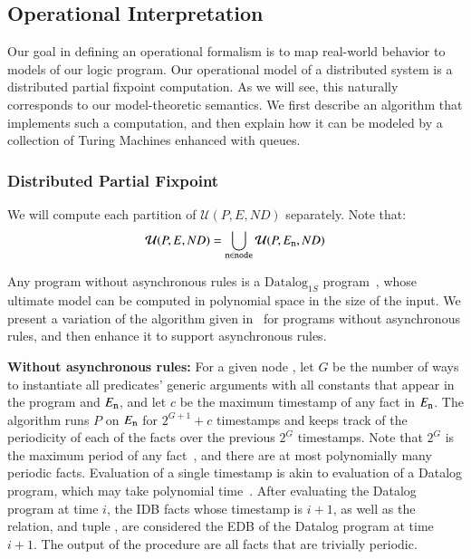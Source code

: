 \subsection{Operational Interpretation}
Our goal in defining an operational formalism is to map real-world behavior to models of our logic program.  Our operational model of a distributed system is a distributed partial fixpoint computation.  As we will see, this naturally corresponds to our model-theoretic semantics.  We first describe an algorithm that implements such a computation, and then explain how it can be modeled by a collection of Turing Machines enhanced with queues.

\subsubsection{Distributed Partial Fixpoint}

We will compute each partition of $\mathcal{U}(P, E, ND)$ separately.  Note that:
$$\mathcal{U}(P, E, ND) = \bigcup_{\text{\dedalus{{\scriptsize n}}} \in \text{\dedalus{{\scriptsize node}}}} \mathcal{U}(P, E_{\text{\dedalus{{\scriptsize n}}}}, ND)$$

Any \lang program without asynchronous rules is a $\text{Datalog}_{1S}$ program~\cite{tdd}, whose ultimate model can be computed in polynomial space in the size of the input.  We present a variation of the algorithm given in~\cite{tdd} for programs without asynchronous rules, and then enhance it to support asynchronous rules.

\vspace{1em}
{\bf Without asynchronous rules:}
For a given node , let $G$ be the number of ways to instantiate all predicates' generic arguments with all constants that appear in the program and $E_{\text{\dedalus{{\scriptsize n}}}}$, and let $c$ be the maximum timestamp of any fact in $E_{\text{\dedalus{{\scriptsize n}}}}$.  The algorithm runs $P$ on $E_{\text{\dedalus{{\scriptsize n}}}}$ for $2^{G+1} + c$ timestamps and keeps track of the periodicity of each of the facts over the previous $2^G$ timestamps.  Note that $2^G$ is the maximum period of any fact~\cite{tdd}, and there are at most polynomially many periodic facts.  Evaluation of a single timestamp is akin to evaluation of a Datalog program, which may take polynomial time~\cite{immerman-ptime, vardi-ptime}.  After evaluating the Datalog program at time $i$, the IDB facts whose timestamp is $i+1$, as well as the  relation, and tuple , are considered the EDB of the Datalog program at time $i+1$.  The output of the procedure are all facts that are trivially periodic.

